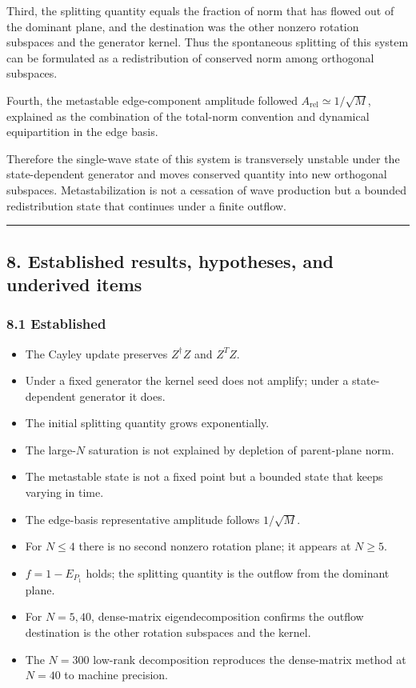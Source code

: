 \documentclass[
  a4paper,
]{article}
\providecommand{\tightlist}{%
  \setlength{\itemsep}{0pt}\setlength{\parskip}{0pt}}
\begin{document}
Third, the splitting quantity equals the fraction of norm that has
flowed out of the dominant plane, and the destination was the other
nonzero rotation subspaces and the generator kernel. Thus the
spontaneous splitting of this system can be formulated as a
redistribution of conserved norm among orthogonal subspaces.

Fourth, the metastable edge-component amplitude followed
\(A_{\mathrm{rel}}\simeq1/\sqrt M\), explained as the combination of the
total-norm convention and dynamical equipartition in the edge basis.

Therefore the single-wave state of this system is transversely unstable
under the state-dependent generator and moves conserved quantity into
new orthogonal subspaces. Metastabilization is not a cessation of wave
production but a bounded redistribution state that continues under a
finite outflow.

\begin{center}\rule{0.5\linewidth}{0.5pt}\end{center}

\subsection{8. Established results, hypotheses, and underived
items}\label{established-results-hypotheses-and-underived-items}

\subsubsection{8.1 Established}\label{established}

\begin{itemize}
\tightlist
\item
  The Cayley update preserves \(Z^\dagger Z\) and \(Z^T Z\).
\item
  Under a fixed generator the kernel seed does not amplify; under a
  state-dependent generator it does.
\item
  The initial splitting quantity grows exponentially.
\item
  The large-\(N\) saturation is not explained by depletion of
  parent-plane norm.
\item
  The metastable state is not a fixed point but a bounded state that
  keeps varying in time.
\item
  The edge-basis representative amplitude follows \(1/\sqrt M\).
\item
  For \(N\le4\) there is no second nonzero rotation plane; it appears at
  \(N\ge5\).
\item
  \(f=1-E_{P_1}\) holds; the splitting quantity is the outflow from the
  dominant plane.
\item
  For \(N=5,40\), dense-matrix eigendecomposition confirms the outflow
  destination is the other rotation subspaces and the kernel.
\item
  The \(N=300\) low-rank decomposition reproduces the dense-matrix
  method at \(N=40\) to machine precision.
\end{itemize}
\end{document}
